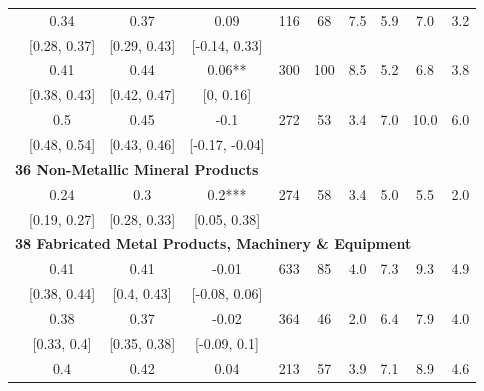\documentclass[
  12pt]{article}
\theoremstyle{definition}
\theoremstyle{remark}
\begin{document}
\begin{table}
{\begin{tabular}[t]{c|c|c|c|c|c|c|c|c|c}
\hline
\hspace{1em} & 0.34 & 0.37 & 0.09 & 116 & 68 & 7.5 & 5.9 & 7.0 & 3.2\\
\cline{2-10}
\hspace{1em}\multirow[t]{-2}{*}{\centering\arraybackslash 351} & [0.28, 0.37] & [0.29, 0.43] & [-0.14, 0.33] &  &  &  &  &  & \\
\cline{1-10}
\hspace{1em} & 0.41 & 0.44 & 0.06** & 300 & 100 & 8.5 & 5.2 & 6.8 & 3.8\\
\cline{2-10}
\hspace{1em}\multirow[t]{-2}{*}{\centering\arraybackslash 352} & [0.38, 0.43] & [0.42, 0.47] & [0, 0.16] &  &  &  &  &  & \\
\cline{1-10}
\hspace{1em} & 0.5 & 0.45 & -0.1 & 272 & 53 & 3.4 & 7.0 & 10.0 & 6.0\\
\cline{2-10}
\hspace{1em}\multirow[t]{-2}{*}{\centering\arraybackslash 356} & [0.48, 0.54] & [0.43, 0.46] & [-0.17, -0.04] &  &  &  &  &  & \\
\cline{1-10}
\multicolumn{10}{l}{\textbf{36 Non-Metallic Mineral Products}}\\
\hline
\hspace{1em} & 0.24 & 0.3 & 0.2*** & 274 & 58 & 3.4 & 5.0 & 5.5 & 2.0\\
\cline{2-10}
\hspace{1em}\multirow[t]{-2}{*}{\centering\arraybackslash 369} & [0.19, 0.27] & [0.28, 0.33] & [0.05, 0.38] &  &  &  &  &  & \\
\cline{1-10}
\multicolumn{10}{l}{\textbf{38 Fabricated Metal Products, Machinery \& Equipment}}\\
\hline
\hspace{1em} & 0.41 & 0.41 & -0.01 & 633 & 85 & 4.0 & 7.3 & 9.3 & 4.9\\
\cline{2-10}
\hspace{1em}\multirow[t]{-2}{*}{\centering\arraybackslash 381} & [0.38, 0.44] & [0.4, 0.43] & [-0.08, 0.06] &  &  &  &  &  & \\
\cline{1-10}
\hspace{1em} & 0.38 & 0.37 & -0.02 & 364 & 46 & 2.0 & 6.4 & 7.9 & 4.0\\
\cline{2-10}
\hspace{1em}\multirow[t]{-2}{*}{\centering\arraybackslash 382} & [0.33, 0.4] & [0.35, 0.38] & [-0.09, 0.1] &  &  &  &  &  & \\
\cline{1-10}
\hspace{1em} & 0.4 & 0.42 & 0.04 & 213 & 57 & 3.9 & 7.1 & 8.9 & 4.6\\

\end{tabular}}
\end{table}
\end{document}
